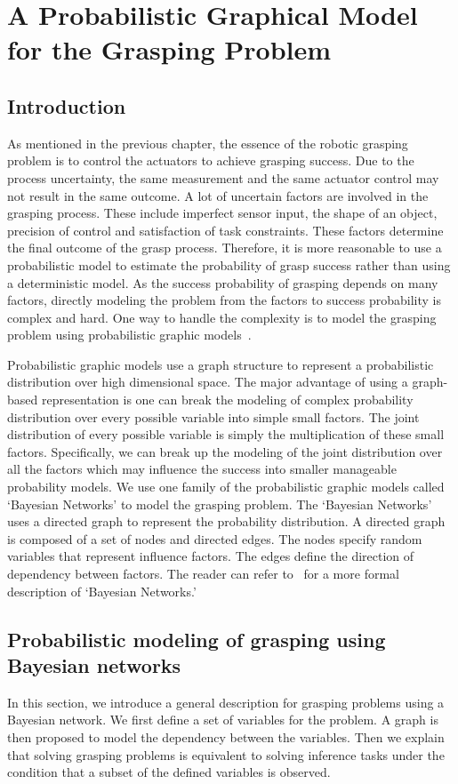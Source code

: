 \chapter{A Probabilistic Graphical Model for the Grasping Problem}
\label{chapter2}
\section{Introduction}
As mentioned in the previous chapter, the essence of the robotic grasping problem is to control the actuators to achieve grasping success. Due to the process uncertainty, the same measurement and the same actuator control may not result in the same outcome.  A lot of uncertain factors are involved in the grasping process. These include imperfect sensor input, the shape of an object, precision of control and satisfaction of task constraints. These factors determine the final outcome of the grasp process. Therefore, it is more reasonable to use a probabilistic model to estimate the probability of grasp success rather than using a deterministic model. As the success probability of grasping depends on many factors, directly modeling the problem from the factors to success probability is complex and hard. One way to handle the complexity is to model the grasping problem using probabilistic graphic models~\cite{Koller1989}.  

Probabilistic graphic models use a graph structure to represent a probabilistic distribution over high dimensional space. The major advantage of using a graph-based representation is one can break the modeling of complex probability distribution over every possible variable into simple small factors. The joint distribution of every possible variable is simply the multiplication of these small factors. Specifically,  we can break up the modeling of the joint distribution over all the factors which may influence the success into smaller manageable probability models.  We use one family of the probabilistic graphic models called `Bayesian Networks' to model the grasping problem. The `Bayesian Networks' uses a directed graph to represent    the probability distribution. A directed graph is composed of a set of nodes and directed edges. The nodes specify random variables that represent influence factors. The edges define the direction of dependency between factors. The reader can refer to~\cite{Korb2003} for a more formal description of  `Bayesian Networks.'  


\section{Probabilistic modeling of grasping using Bayesian networks}
In this section, we introduce a general description for grasping problems using a Bayesian network. We first define a set of variables for the problem. A graph is then proposed to model the dependency between the variables. Then we explain that solving grasping problems is equivalent to solving inference tasks under the condition that a subset of the defined variables is observed.   
